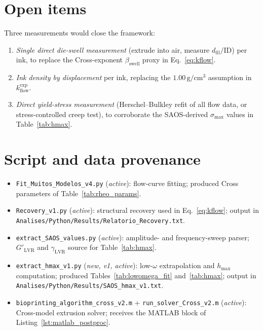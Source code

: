 \documentclass[11pt,a4paper]{article}
\begin{document}
\section{Open items}
\label{sec:open}

Three measurements would close the framework:
\begin{enumerate}[leftmargin=1.6em]
\item \emph{Single direct die-swell measurement} (extrude into air, measure
$d_\mathrm{fil}/\mathrm{ID}$) per ink, to replace the Cross-exponent $\beta_\mathrm{swell}$
proxy in Eq.~\ref{eq:kflow}.
\item \emph{Ink density by displacement} per ink, replacing the
$1.00\,\mathrm{g/cm^3}$ assumption in $k_\mathrm{flow}^\mathrm{exp}$.
\item \emph{Direct yield-stress measurement} (Herschel--Bulkley refit of all flow
data, or stress-controlled creep test), to corroborate the SAOS-derived
$\sigma_\mathrm{max}$ values in Table~\ref{tab:hmax}.
\end{enumerate}

\section*{Script and data provenance}

\begin{itemize}[leftmargin=1.6em]
\item \texttt{Fit\_Muitos\_Modelos\_v4.py} (\emph{active}): flow-curve fitting;
   produced Cross parameters of Table~\ref{tab:rheo_params}.
\item \texttt{Recovery\_v1.py} (\emph{active}): structural recovery used in
   Eq.~\ref{eq:kflow}; output in
   \texttt{Analises/Python/Results/Relatorio\_Recovery.txt}.
\item \texttt{extract\_SAOS\_values.py} (\emph{active}): amplitude- and
   frequency-sweep parser; $G'_\mathrm{LVR}$ and $\gamma_\mathrm{LVR}$ source for
   Table~\ref{tab:hmax}.
\item \texttt{extract\_hmax\_v1.py} (\emph{new, v1, active}): low-$\omega$
   extrapolation and $h_\mathrm{max}$ computation; produced
   Tables~\ref{tab:lowomega_fit} and~\ref{tab:hmax}; output in
   \texttt{Analises/Python/Results/SAOS\_hmax\_v1.txt}.
\item \texttt{bioprinting\_algorithm\_cross\_v2.m} +
   \texttt{run\_solver\_Cross\_v2.m} (\emph{active}): Cross-model extrusion
   solver; receives the MATLAB block of Listing~\ref{lst:matlab_postproc}.
\end{itemize}



\end{document}
